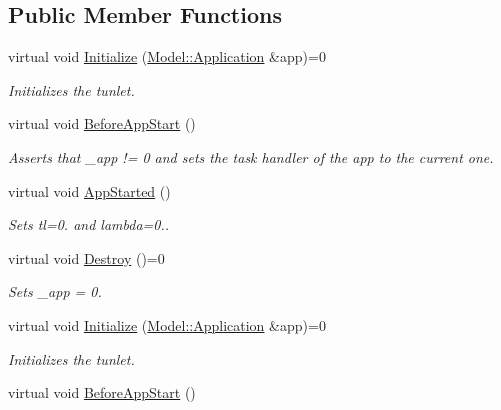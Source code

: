 \subsection*{Public Member Functions}
\begin{DoxyCompactItemize}
\item 
virtual void \hyperlink{class_tunlet_aeb84d0844192764dc9aef3cb905c4e7e}{Initialize} (\hyperlink{class_model_1_1_application}{Model\-::\-Application} \&app)=0
\begin{DoxyCompactList}\small\item\em Initializes the tunlet. \end{DoxyCompactList}\item 
\hypertarget{class_tunlet_aa4b222d6267660d272febf75c9abaa6a}{virtual void \hyperlink{class_tunlet_aa4b222d6267660d272febf75c9abaa6a}{Before\-App\-Start} ()}\label{class_tunlet_aa4b222d6267660d272febf75c9abaa6a}

\begin{DoxyCompactList}\small\item\em Asserts that \-\_\-app != 0 and sets the task handler of the app to the current one. \end{DoxyCompactList}\item 
\hypertarget{class_tunlet_a919d9ef63c660560fe23aea88eb236aa}{virtual void \hyperlink{class_tunlet_a919d9ef63c660560fe23aea88eb236aa}{App\-Started} ()}\label{class_tunlet_a919d9ef63c660560fe23aea88eb236aa}

\begin{DoxyCompactList}\small\item\em Sets tl=0. and lambda=0.. \end{DoxyCompactList}\item 
\hypertarget{class_tunlet_a182f5368c0cd635a1ce8fe80ef4c013b}{virtual void \hyperlink{class_tunlet_a182f5368c0cd635a1ce8fe80ef4c013b}{Destroy} ()=0}\label{class_tunlet_a182f5368c0cd635a1ce8fe80ef4c013b}

\begin{DoxyCompactList}\small\item\em Sets \-\_\-app = 0. \end{DoxyCompactList}\item 
virtual void \hyperlink{class_tunlet_aeb84d0844192764dc9aef3cb905c4e7e}{Initialize} (\hyperlink{class_model_1_1_application}{Model\-::\-Application} \&app)=0
\begin{DoxyCompactList}\small\item\em Initializes the tunlet. \end{DoxyCompactList}\item 
\hypertarget{class_tunlet_aa4b222d6267660d272febf75c9abaa6a}{virtual void \hyperlink{class_tunlet_aa4b222d6267660d272febf75c9abaa6a}{Before\-App\-Start} ()}\label{class_tunlet_aa4b222d6267660d272febf75c9abaa6a}


\end{DoxyCompactItemize}
